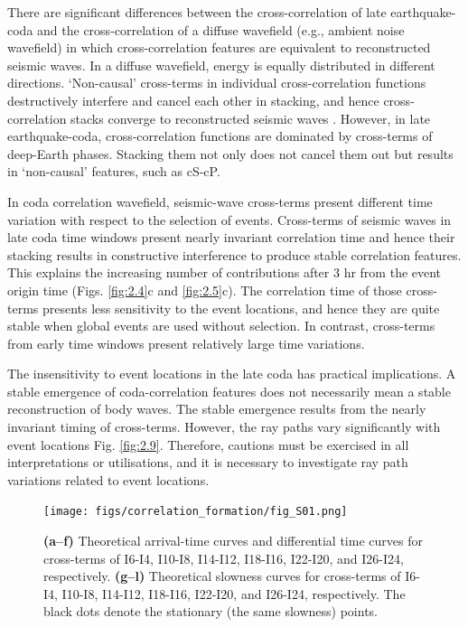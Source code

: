 There are significant differences between the cross-correlation of late earthquake-coda and the cross-correlation of a diffuse wavefield (e.g., ambient noise wavefield) in which cross-correlation features are equivalent to reconstructed seismic waves. In a diffuse wavefield, energy is equally distributed in different directions. `Non-causal' cross-terms in individual cross-correlation functions destructively interfere and cancel each other in stacking, and hence cross-correlation stacks converge to reconstructed seismic waves \citep[e.g.,][]{snieder_cancellation_2008,snieder_cancellation_2010}. However, in late earthquake-coda, cross-correlation functions are dominated by cross-terms of deep-Earth phases. Stacking them not only does not cancel them out but results in `non-causal' features, such as cS-cP.



In coda correlation wavefield, seismic-wave cross-terms present different time variation with respect to the selection of events. Cross-terms of seismic waves in late coda time windows present nearly invariant correlation time and hence their stacking results in constructive interference to produce stable correlation features. This explains the increasing number of contributions after 3 hr from the event origin time (Figs. \ref{fig:2.4}c and \ref{fig:2.5}c). The correlation time of those cross-terms presents less sensitivity to the event locations, and hence they are quite stable when global events are used without selection. In contrast, cross-terms from early time windows present relatively large time variations.



The insensitivity to event locations in the late coda has practical implications. A stable emergence of coda-correlation features does not necessarily mean a stable reconstruction of body waves. The stable emergence results from the nearly invariant timing of cross-terms. However, the ray paths vary significantly with event locations  Fig. \ref{fig:2.9}. Therefore, cautions must be exercised in all interpretations or utilisations, and it is necessary to investigate ray path variations related to event locations.



\begin{figure}[!hbt]
	\centering
	\texttt{[image: figs/correlation\_formation/fig\_S01.png]}
	\caption[Theoretical arrival-time and slowness curves for different I2* constituents]
    {
		\textbf{(a--f)} Theoretical arrival-time curves and differential time curves for cross-terms of I6-I4, I10-I8, I14-I12, I18-I16, I22-I20, and I26-I24, respectively. \textbf{(g--l)} Theoretical slowness curves for cross-terms of I6-I4, I10-I8, I14-I12, I18-I16, I22-I20, and I26-I24, respectively. The black dots denote the stationary (the same slowness) points. 
	}
	\label{fig:2.S1}
\end{figure}


